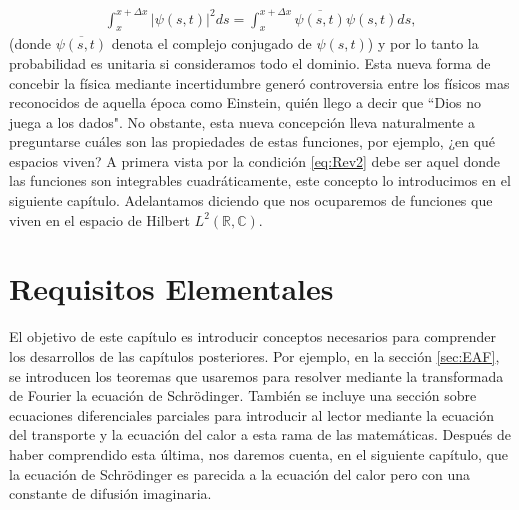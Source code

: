 \documentclass[12pt]{article}
\theoremstyle{definition}
\newcommand*{\field}[1]{\mathbb{#1}}
\begin{document}
\begin{align*}
    \int_{x}^{x+\Delta x}
    |\psi(s,t)|^2 ds =
    \int_{x}^{x+\Delta x}
    \overline{\psi(s,t)}\psi(s,t)ds,
\end{align*}
(donde $\overline{\psi(s,t)}$ denota el complejo conjugado de $\psi(s,t)$) y por lo tanto la probabilidad es unitaria si consideramos todo el dominio.
Esta nueva forma de concebir la física mediante incertidumbre generó controversia entre los físicos mas reconocidos de aquella época como Einstein, quién llego a decir que ``Dios no juega a los dados". No obstante, esta nueva concepción lleva naturalmente a preguntarse cuáles son las propiedades de estas funciones, por ejemplo, ¿en qué espacios viven? A primera vista por la condición \eqref{eq:Rev2} debe ser aquel donde las funciones son integrables cuadráticamente, este concepto lo introducimos en el siguiente capítulo. Adelantamos diciendo que nos ocuparemos de funciones que viven en el espacio de Hilbert $L^2(\field{R},\field{C})$.
\newpage
\section{Requisitos Elementales}
\label{cap:Requisitos}
\noindent
El objetivo de este capítulo es introducir conceptos necesarios para comprender los desarrollos de las capítulos posteriores. Por ejemplo, en la sección  \ref{sec:EAF}, se introducen los teoremas que usaremos para resolver mediante la transformada de Fourier la ecuación de Schrödinger. También se incluye una sección sobre ecuaciones diferenciales parciales para introducir al lector mediante la ecuación del transporte y la ecuación del calor a esta rama de las matemáticas. Después de haber comprendido esta última, nos daremos cuenta, en el siguiente capítulo, que la ecuación de Schrödinger es parecida a la ecuación del calor pero con una constante de difusión imaginaria. 
\end{document}
